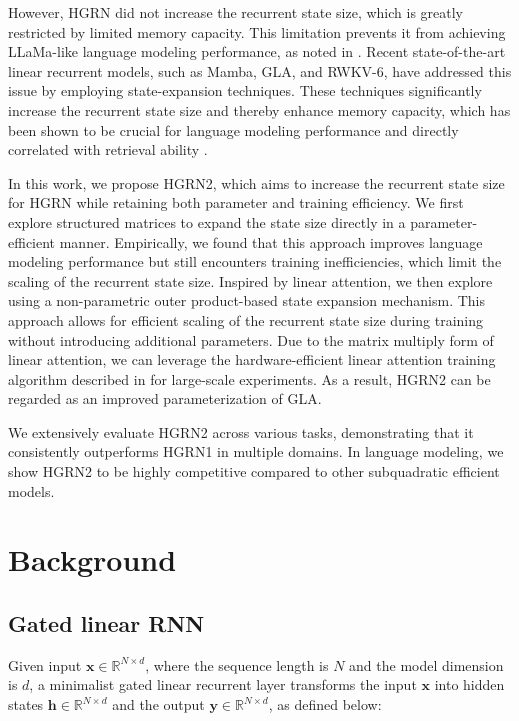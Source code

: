 However, HGRN did not increase the recurrent state size, which is greatly restricted by limited memory capacity. This limitation prevents it from achieving LLaMa-like \citep{touvron2023llama,2307.09288} language modeling performance, as noted in \cite{lightning2}. Recent state-of-the-art linear recurrent models, such as Mamba, GLA, and RWKV-6, have addressed this issue by employing state-expansion techniques. These techniques significantly increase the recurrent state size and thereby enhance memory capacity, which has been shown to be crucial for language modeling performance and directly correlated with retrieval ability \citep{based}.

In this work, we propose HGRN2, which aims to increase the recurrent state size for HGRN while retaining both parameter and training efficiency. We first explore structured matrices to expand the state size directly in a parameter-efficient manner. Empirically, we found that this approach improves language modeling performance but still encounters training inefficiencies, which limit the scaling of the recurrent state size. Inspired by linear attention, we then explore using a non-parametric outer product-based state expansion mechanism. This approach allows for efficient scaling of the recurrent state size during training without introducing additional parameters. Due to the matrix multiply form of linear attention, we can leverage the hardware-efficient linear attention training algorithm described in \cite{GLA,lightning2} for large-scale experiments. As a result, HGRN2 can be regarded as an improved parameterization of GLA.

We extensively evaluate HGRN2 across various tasks, demonstrating that it consistently outperforms HGRN1 in multiple domains. In language modeling, we show HGRN2 to be highly competitive compared to other subquadratic efficient models.

\section{Background}
\subsection{Gated linear RNN} Given input \(\mathbf{x} \in \mathbb{R}^{N \times d}\), where the sequence length is \(N\) and the model dimension is \(d\), a minimalist gated linear recurrent layer \citep{parallel-martin} transforms the input \(\mathbf{x}\) into hidden states \(\mathbf{h} \in \mathbb{R}^{N \times d}\) and the output \(\mathbf{y} \in \mathbb{R}^{N \times d}\), as defined below:

